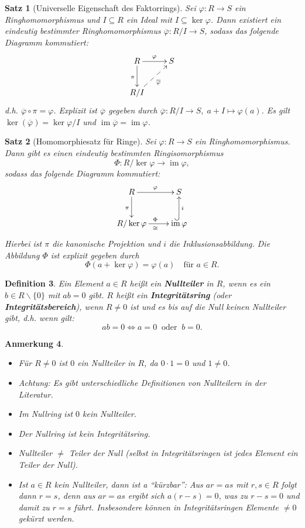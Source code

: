 \documentclass[a4paper, twoside, 11pt, ngerman]{report}
\renewcommand{\setminus}{\smallsetminus}
\DeclareMathOperator{\image}{im}
\theoremstyle{definistyle}
\newtheorem{satz}{Satz}[section]
\newtheorem{defini}[satz]{Definition}
\newtheorem{anm}[satz]{Anmerkung}
\theoremstyle{remark}
\newcommand{\defn}[1]{\textit{\bfseries #1}}
\begin{document}
\begin{satz}[Universelle Eigenschaft des Faktorrings]\label{satz:faktorring_universelle_eigenschaft}
 Sei $\varphi \colon R \to S$ ein Ringhomomorphismus und $I \subseteq R$ ein Ideal mit $I \subseteq \ker \varphi$. Dann existiert ein eindeutig bestimmter Ringhomomorphismus $\overline{\varphi} \colon R / I \to S$, sodass das folgende Diagramm kommutiert:
\[
\xymatrix{
R \ar[r]^{\varphi} \ar[d]_{\pi} & S \\
R / I \ar@{-->}[ur]_{\overline{\varphi}}
}
\]
d.h. $\overline{\varphi} \circ \pi = \varphi$. Explizit ist $\overline{\varphi}$ gegeben durch $\overline{\varphi} \colon R / I \to S, \; a + I \mapsto \varphi(a)$. Es gilt $\ker(\overline{\varphi}) = \ker \varphi / I$ und $\image \overline{\varphi} = \image \varphi$.
\end{satz}

\begin{satz}[Homomorphiesatz für Ringe]\label{satz:homomorphiesatz_ring}
Sei $\varphi \colon R \to S$ ein Ringhomomorphismus. Dann gibt es einen eindeutig bestimmten Ringisomorphismus
\[
\Phi \colon R / \ker \varphi \to \image \varphi,
\]
sodass das folgende Diagramm kommutiert:
\[
\xymatrix{
R \ar[r]^{\varphi} \ar[d]_{\pi} & S \\
R / \ker \varphi  \ar[r]^\Phi_{\cong} & \image \varphi \ar@{^{(}->}[u]_{i}
}
\]
Hierbei ist $\pi$ die kanonische Projektion und $i$ die Inklusionsabbildung. Die Abbildung $\Phi$ ist explizit gegeben durch
\[
\Phi(a + \ker \varphi) = \varphi(a) \quad \text{für } a \in R.
\]
\end{satz}

\begin{defini}\label{def:nullteiler_integritätsring}
Ein Element $a \in R$ heißt ein \defn{Nullteiler} in $R$, wenn es ein $b \in R\setminus\{0\}$ mit $a b = 0$ gibt. $R$ heißt ein \defn{Integritätsring} (oder \defn{Integritätsbereich}), wenn $R \neq 0$ ist und es bis auf die Null keinen Nullteiler gibt, d.h. wenn gilt:
\[
ab=0\iff a=0 \ \text{ oder } \ b=0.
\]
\end{defini}

\begin{anm}\label{anm:nullteiler}
\begin{itemize}
    \item Für $R \neq 0$ ist $0$ ein Nullteiler in $R$, da $0 \cdot 1 = 0$ und $1 \neq 0$.
    \item Achtung: Es gibt unterschiedliche Definitionen von Nullteilern in der Literatur.
    \item Im Nullring ist $0$ kein Nullteiler.
    \item Der Nullring ist kein Integritätsring.
    \item Nullteiler $\neq$ Teiler der Null (selbst in Integritätsringen ist jedes Element ein Teiler der Null).
    \item Ist $a\in R$ kein Nullteiler, dann ist a "`kürzbar"': Aus $ar=as$ mit $r,s\in R$ folgt dann $r=s$, denn aus $ar=as$ ergibt sich $a(r-s)=0$, was zu $r-s=0$ und damit zu $r=s$ führt.
    Insbesondere können in Integritätsringen Elemente $\neq0$ gekürzt werden. 
\end{itemize}
\end{anm}
\end{document}
